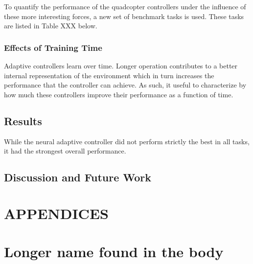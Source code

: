 \documentclass[letterpaper,12pt,titlepage,oneside,final]{book}
\begin{document}
To quantify the performance of the quadcopter controllers under the influence of these more interesting forces, a new set of benchmark tasks is used.
These tasks are listed in Table XXX below.


\subsection{Effects of Training Time}

Adaptive controllers learn over time.
Longer operation contributes to a better internal representation of the environment which in turn increases the performance that the controller can achieve.
As such, it useful to characterize by how much these controllers improve their performance as a function of time.

\section{Results}


While the neural adaptive controller did not perform strictly the best in all tasks, it had the strongest overall performance. 

\section{Discussion and Future Work}



\appendix

\chapter*{APPENDICES}
\chapter[Name in Contents]{Longer name found in the body}
\label{AppendixA}
\end{document}
